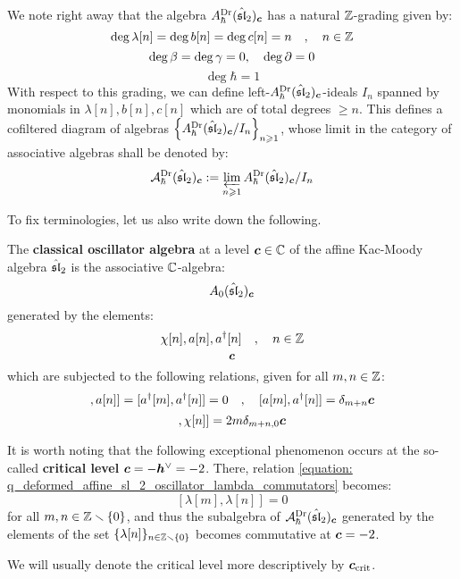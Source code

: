         We note right away that the algebra $A_{\hbar}^{\current}(\hat{\sl}_2)_{\level}$ has a natural $\Z$-grading given by:
            $$\deg \lambda[n] = \deg b[n] = \deg c[n] = n \quad, \quad n \in \Z$$
            $$\deg \beta = \deg \gamma = 0, \quad \deg \del = 0$$
            $$\deg \hbar = 1$$
        With respect to this grading, we can define left-$A_{\hbar}^{\current}(\hat{\sl}_2)_{\level}$-ideals $I_n$ spanned by monomials in $\lambda[n], b[n], c[n]$ which are of total degrees $\geq n$. This defines a cofiltered diagram of algebras $\left\{ A_{\hbar}^{\current}(\hat{\sl}_2)_{\level}/I_n \right\}_{n \geq 1}$, whose limit in the category of associative algebras shall be denoted by:
            $$\calA_{\hbar}^{\current}(\hat{\sl}_2)_{\level} := \projlim_{n \geq 1} A_{\hbar}^{\current}(\hat{\sl}_2)_{\level}/I_n$$

        To fix terminologies, let us also write down the following.
        \begin{definition} \label{def: classical_affine_sl_2_oscillator_algebra_drinfeld_current_presentation}
            The \textbf{classical oscillator algebra} at a level $\level \in \bbC$ of the affine Kac-Moody algebra $\hat{\sl}_2$ is the associative $\bbC$-algebra:
                $$A_0(\hat{\sl}_2)_{\level}$$
            generated by the elements:
                $$\chi[n], a[n], a^{\dagger}[n] \quad, \quad n \in \Z$$
                $$\level$$
            which are subjected to the following relations, given for all $m, n \in \Z$:
                \begin{equation}
                    [ a[m], a[n] ] = [ a^{\dagger}[m], a^{\dagger}[n] ] = 0 \quad, \quad [ a[m], a^{\dagger}[n] ] = \delta_{m + n} \level
                \end{equation}
                \begin{equation}
                    [ \chi[m], \chi[n] ] = 2m \delta_{m + n, 0} \level
                \end{equation}
        \end{definition}

        \begin{remark} \label{remark: q_deformed_affine_sl_2_oscillator_algebra_drinfeld_current_presentation_at_critical_level}
            It is worth noting that the following exceptional phenomenon occurs at the so-called \textbf{critical level} $\level = -\dualcoxeter = -2$. There, relation \eqref{equation: q_deformed_affine_sl_2_oscillator_lambda_commutators} becomes:
                $$[\lambda[m], \lambda[n]] = 0$$
            for all $m, n \in \Z \setminus \{0\}$, and thus the subalgebra of $\calA_{\hbar}^{\current}(\hat{\sl}_2)_{\level}$ generated by the elements of the set $\{ \lambda[n] \}_{n \in \Z \setminus \{0\}}$ becomes commutative at $\level = -2$.
        \end{remark}
        \begin{convention}
            We will usually denote the critical level more descriptively by $\level_{\crit}$.
        \end{convention}
        
